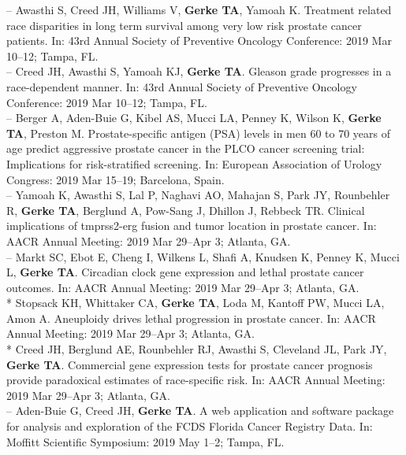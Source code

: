 \documentclass[11pt, a4paper]{article} %
\begin{document}
-- Awasthi S, Creed JH, Williams V, {\bf Gerke TA}, Yamoah K. Treatment related race disparities in long term survival among very low risk prostate cancer patients. In: 43rd Annual Society of Preventive Oncology Conference: 2019 Mar 10--12; Tampa, FL. \\

-- Creed JH, Awasthi S, Yamoah KJ, {\bf Gerke TA}. Gleason grade progresses in a race-dependent manner. In: 43rd Annual Society of Preventive Oncology Conference: 2019 Mar 10--12; Tampa, FL.\\

-- Berger A, Aden-Buie G, Kibel AS, Mucci LA, Penney K, Wilson K, {\bf Gerke TA}, Preston M. Prostate-specific antigen (PSA) levels in men 60 to 70 years of age predict aggressive prostate cancer in the PLCO cancer screening trial: Implications for risk-stratified screening. In: European Association of Urology Congress: 2019 Mar 15--19; Barcelona, Spain.\\

-- Yamoah K, Awasthi S, Lal P, Naghavi AO, Mahajan S, Park JY, Rounbehler R, {\bf Gerke TA}, Berglund A, Pow-Sang J, Dhillon J, Rebbeck TR. Clinical implications of tmprss2-erg fusion and tumor location in prostate cancer. In: AACR Annual Meeting: 2019 Mar 29--Apr 3; Atlanta, GA.\\

-- Markt SC, Ebot E, Cheng I, Wilkens L, Shafi A, Knudsen K, Penney K, Mucci L, {\bf Gerke TA}. Circadian clock gene expression and lethal prostate cancer outcomes. In: AACR Annual Meeting: 2019 Mar 29--Apr 3; Atlanta, GA.\\

* Stopsack KH, Whittaker CA, {\bf Gerke TA}, Loda M, Kantoff PW, Mucci LA, Amon A. Aneuploidy drives lethal progression in prostate cancer. In: AACR Annual Meeting: 2019 Mar 29--Apr 3; Atlanta, GA.\\

* Creed JH, Berglund AE, Rounbehler RJ, Awasthi S, Cleveland JL, Park JY, {\bf Gerke TA}. Commercial gene expression tests for prostate cancer prognosis provide  paradoxical estimates of race-specific risk. In: AACR Annual Meeting: 2019 Mar 29--Apr 3; Atlanta, GA.\\

-- Aden-Buie G, Creed JH, {\bf Gerke TA}. A web application and software package for analysis and exploration of the FCDS Florida Cancer Registry Data. In: Moffitt Scientific Symposium: 2019 May 1--2; Tampa, FL.\\
\end{document}
